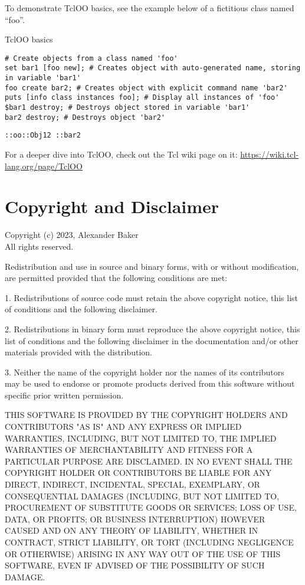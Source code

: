 To demonstrate TclOO basics, see the example below of a fictitious class named ``foo''.
\begin{example}{TclOO basics}
\begin{lstlisting}
# Create objects from a class named 'foo'
set bar1 [foo new]; # Creates object with auto-generated name, storing in variable 'bar1'
foo create bar2; # Creates object with explicit command name 'bar2'
puts [info class instances foo]; # Display all instances of 'foo'
$bar1 destroy; # Destroys object stored in variable 'bar1'
bar2 destroy; # Destroys object 'bar2'
\end{lstlisting}
\tcblower
\begin{lstlisting}
::oo::Obj12 ::bar2
\end{lstlisting}
\end{example}
For a deeper dive into TclOO, check out the Tcl wiki page on it: \hyperlink{https://wiki.tcl-lang.org/page/TclOO}{https://wiki.tcl-lang.org/page/TclOO}

\cleartooddpage[\thispagestyle{empty}]
\section*{Copyright and Disclaimer}

Copyright (c) 2023, Alexander Baker \\
All rights reserved.

Redistribution and use in source and binary forms, with or without
modification, are permitted provided that the following conditions are met:

1. Redistributions of source code must retain the above copyright notice, this
   list of conditions and the following disclaimer.

2. Redistributions in binary form must reproduce the above copyright notice,
   this list of conditions and the following disclaimer in the documentation
   and/or other materials provided with the distribution.

3. Neither the name of the copyright holder nor the names of its
   contributors may be used to endorse or promote products derived from
   this software without specific prior written permission.

THIS SOFTWARE IS PROVIDED BY THE COPYRIGHT HOLDERS AND CONTRIBUTORS "AS IS"
AND ANY EXPRESS OR IMPLIED WARRANTIES, INCLUDING, BUT NOT LIMITED TO, THE
IMPLIED WARRANTIES OF MERCHANTABILITY AND FITNESS FOR A PARTICULAR PURPOSE ARE
DISCLAIMED. IN NO EVENT SHALL THE COPYRIGHT HOLDER OR CONTRIBUTORS BE LIABLE
FOR ANY DIRECT, INDIRECT, INCIDENTAL, SPECIAL, EXEMPLARY, OR CONSEQUENTIAL
DAMAGES (INCLUDING, BUT NOT LIMITED TO, PROCUREMENT OF SUBSTITUTE GOODS OR
SERVICES; LOSS OF USE, DATA, OR PROFITS; OR BUSINESS INTERRUPTION) HOWEVER
CAUSED AND ON ANY THEORY OF LIABILITY, WHETHER IN CONTRACT, STRICT LIABILITY,
OR TORT (INCLUDING NEGLIGENCE OR OTHERWISE) ARISING IN ANY WAY OUT OF THE USE
OF THIS SOFTWARE, EVEN IF ADVISED OF THE POSSIBILITY OF SUCH DAMAGE.
